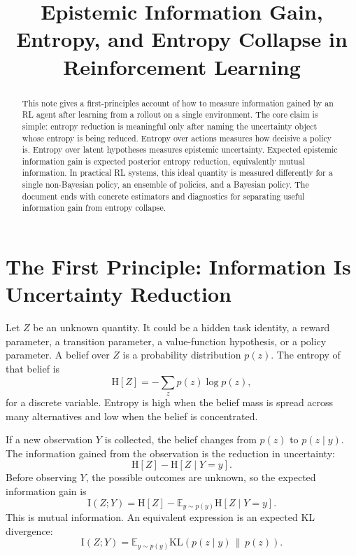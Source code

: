 \documentclass[11pt]{article}
\title{Epistemic Information Gain, Entropy, and Entropy Collapse in Reinforcement Learning}
\author{}
\date{}
\newcommand{\E}{\mathbb{E}}
\newcommand{\KL}{\mathrm{KL}}
\newcommand{\Hent}{\mathrm{H}}
\newcommand{\I}{\mathrm{I}}
\begin{document}
\maketitle

\begin{abstract}
This note gives a first-principles account of how to measure information gained
by an RL agent after learning from a rollout on a single environment. The core
claim is simple: entropy reduction is meaningful only after naming the
uncertainty object whose entropy is being reduced. Entropy over actions measures
how decisive a policy is. Entropy over latent hypotheses measures epistemic
uncertainty. Expected epistemic information gain is expected posterior entropy
reduction, equivalently mutual information. In practical RL systems, this ideal
quantity is measured differently for a single non-Bayesian policy, an ensemble of
policies, and a Bayesian policy. The document ends with concrete estimators and
diagnostics for separating useful information gain from entropy collapse.
\end{abstract}

\section{The First Principle: Information Is Uncertainty Reduction}

Let $Z$ be an unknown quantity. It could be a hidden task identity, a reward
parameter, a transition parameter, a value-function hypothesis, or a policy
parameter. A belief over $Z$ is a probability distribution $p(z)$. The entropy of
that belief is
\begin{equation}
  \Hent[Z]
  =
  -\sum_z p(z)\log p(z),
\end{equation}
for a discrete variable. Entropy is high when the belief mass is spread across
many alternatives and low when the belief is concentrated.

If a new observation $Y$ is collected, the belief changes from $p(z)$ to
$p(z \mid y)$. The information gained from the observation is the reduction in
uncertainty:
\begin{equation}
  \Hent[Z] - \Hent[Z \mid Y=y].
\end{equation}
Before observing $Y$, the possible outcomes are unknown, so the expected
information gain is
\begin{equation}
  \I(Z;Y)
  =
  \Hent[Z] - \E_{y \sim p(y)}\Hent[Z \mid Y=y].
\end{equation}
This is mutual information. An equivalent expression is an expected KL
divergence:
\begin{equation}
  \I(Z;Y)
  =
  \E_{y \sim p(y)}
  \KL\left(p(z \mid y)\,\|\,p(z)\right).
\end{equation}
\end{document}
